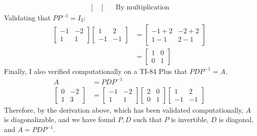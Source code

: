 \documentclass[10pt,letterpaper,final]{report}
\newcommand{\reason}[1]{&& \text{#1}}
\begin{document}
\begin{enumerate}[label=(\alph*)]
\begin{align*}
\begin{bmatrix}
                     \end{bmatrix} \reason{By multiplication}
        \end{align*}
        Validating that $PP^{-1} = I_2$:
        \begin{align*}
          \begin{bmatrix}
            -1 & -2 \\
            1  & 1
          \end{bmatrix}\begin{bmatrix}
                         1  & 2  \\
                         -1 & -1
                       \end{bmatrix} & = \begin{bmatrix}
                                           -1 + 2 & -2 + 2 \\
                                           1 - 1  & 2 - 1
                                         \end{bmatrix}    \\[1ex]
                                         & = \begin{bmatrix}
                                               1 & 0 \\
                                               0 & 1
                                             \end{bmatrix}
        \end{align*}
        Finally, I also verified computationally on a TI-84 Plus that $PDP^{-1} = A$.
        \begin{align*}
          A                 & = PDP^{-1}                               \\[1ex]
          \begin{bmatrix}
            0 & -2 \\
            1 & 3
          \end{bmatrix} & = \begin{bmatrix}
                              -1 & -2 \\
                              1  & 1
                            \end{bmatrix}\begin{bmatrix}
                                           2 & 0 \\
                                           0 & 1
                                         \end{bmatrix}\begin{bmatrix}
                                                        1  & 2  \\
                                                        -1 & -1
                                                      \end{bmatrix}
        \end{align*}
        Therefore, by the derivation above, which has been validated computationally, $A$ is diagonalizable, and we have found $P, D$ such that $P$ is invertible, $D$ is diagonal, and $A = PDP^{-1}$.


\end{enumerate}
\end{document}
